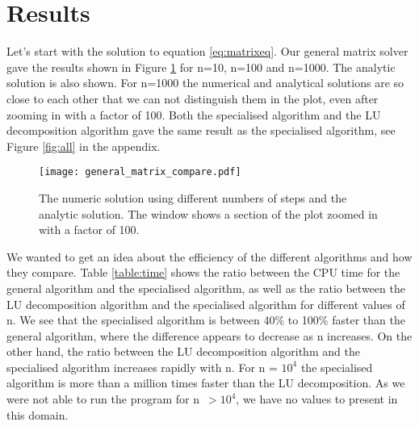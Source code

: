 \section{Results}
\label{sec:results}


%
%

Let's start with the solution to equation \ref{eq:matrixeq}. Our general matrix solver gave the results shown in Figure \ref{fig:compare} for n=10, n=100 and n=1000. The analytic solution is also shown. For n=1000 the numerical and analytical solutions are so close to each other that we can not distinguish them in the plot, even after zooming in with a factor of 100. Both the specialised algorithm and the LU decomposition algorithm gave the same result as the specialised algorithm, see Figure \ref{fig:all} in the appendix. 
\begin{figure}[htbp]
	\centering
	\texttt{[image: general\_matrix\_compare.pdf]}
	\caption{The numeric solution using different numbers of steps and the analytic solution. The window shows a section of the plot zoomed in with a factor of 100.}
	\label{fig:compare}
\end{figure}

We wanted to get an idea about the efficiency of the different algorithms and how they compare. Table \ref{table:time} shows the ratio between the CPU time for the general algorithm and the specialised algorithm, as well as the ratio between the LU decomposition algorithm and the specialised algorithm for different values of n. We see that the specialised algorithm is between 40\% to 100\% faster than the general algorithm, where the difference appears to decrease as n increases. On the other hand, the ratio between the LU decomposition algorithm and the specialised algorithm increases rapidly with n. For n = $10^4$ the specialised algorithm is more than a million times faster than the LU decomposition. As we were not able to run the program for n $\,>10^4$, we have no values to present in this domain.

